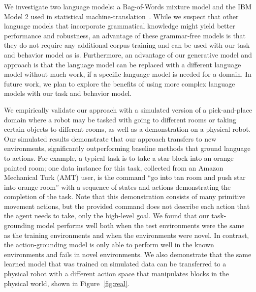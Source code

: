 \documentclass[conference]{IEEEtran}
\begin{document}
We investigate two language models: a Bag-of-Words mixture model and
the IBM Model 2 used in statistical machine-translation~\cite{brown90,brown93}. While we suspect that other language
models that incorporate grammatical knowledge might yield better
performance and robustness, an advantage of these grammar-free models
is that they do not require any additional corpus training and can be
used with our task and behavior model as is. Furthermore, an advantage
of our generative model and approach is that the language model can be
replaced with a different language model without much work, if a
specific language model is needed for a domain. In future work, we
plan to explore the benefits of using more complex language models
with our task and behavior model.

We empirically validate our approach with a simulated version of a
pick-and-place domain where a robot may be tasked with going to
different rooms or taking certain objects to different rooms, as well
as a demonstration on a physical robot.  Our simulated results
demonstrate that our approach transfers to new environments,
significantly outperforming baseline methods that ground language to
actions.  For example, a typical task is to take a star block into an
orange painted room; one data instance for this task, collected from
an Amazon Mechanical Turk (AMT) user, is the command ``go into tan
room and push star into orange room'' with a sequence of states and
actions demonstrating the completion of the task. Note that this
demonstration consists of many primitive movement actions, but the
provided command does not describe each action that the agent needs to
take, only the high-level goal.  We found that our task-grounding
model performs well both when the test environments were the same as
the training environments and when the environments were novel. In
contrast, the action-grounding model is only able to perform well in
the known environments and fails in novel environments.  We also
demonstrate that the same learned model that was trained on simulated
data can be transferred to a physical robot with a different action
space that manipulates blocks in the physical world, shown in
Figure~\ref{fig:real}.


\end{document}
